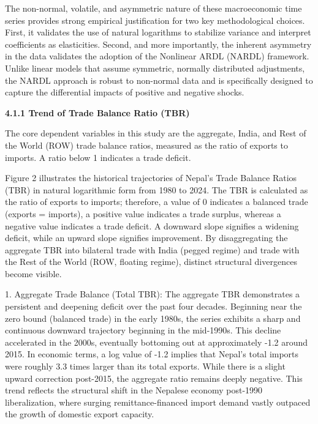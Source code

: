 \documentclass[12pt]{article}
\begin{document}
The non-normal, volatile, and asymmetric nature of these macroeconomic time series provides strong empirical justification for two key methodological choices. First, it validates the use of natural logarithms to stabilize variance and interpret coefficients as elasticities. Second, and more importantly, the inherent asymmetry in the data validates the adoption of the Nonlinear ARDL (NARDL) framework. Unlike linear models that assume symmetric, normally distributed adjustments, the NARDL approach is robust to non-normal data and is specifically designed to capture the differential impacts of positive and negative shocks.

\vspace{0.5cm}
\noindent\textbf{4.1.1 Trend of Trade Balance Ratio (TBR)}

The core dependent variables in this study are the aggregate, India, and Rest of the World (ROW) trade balance ratios, measured as the ratio of exports to imports. A ratio below 1 indicates a trade deficit.

Figure 2 illustrates the historical trajectories of Nepal’s Trade Balance Ratios (TBR) in natural logarithmic form from 1980 to 2024. The TBR is calculated as the ratio of exports to imports; therefore, a value of 0 indicates a balanced trade (exports = imports), a positive value indicates a trade surplus, whereas a negative value indicates a trade deficit. A downward slope signifies a widening deficit, while an upward slope signifies improvement. By disaggregating the aggregate TBR into bilateral trade with India (pegged regime) and trade with the Rest of the World (ROW, floating regime), distinct structural divergences become visible.

1. Aggregate Trade Balance (Total TBR):
The aggregate TBR demonstrates a persistent and deepening deficit over the past four decades. Beginning near the zero bound (balanced trade) in the early 1980s, the series exhibits a sharp and continuous downward trajectory beginning in the mid-1990s. This decline accelerated in the 2000s, eventually bottoming out at approximately -1.2 around 2015. In economic terms, a log value of -1.2 implies that Nepal’s total imports were roughly 3.3 times larger than its total exports. While there is a slight upward correction post-2015, the aggregate ratio remains deeply negative. This trend reflects the structural shift in the Nepalese economy post-1990 liberalization, where surging remittance-financed import demand vastly outpaced the growth of domestic export capacity.
\end{document}
